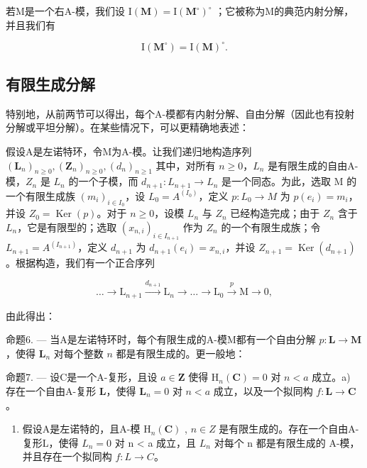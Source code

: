 若M是一个右A-模，我们设 \(\mathrm{I}(\mathbf{M}) = \mathrm{I}(\mathbf{M}^{\circ})^{\circ}\) ；它被称为M的典范内射分解，并且我们有

\[
\mathrm{I} (\mathbf {M} ^ {\circ}) = \mathrm{I} (\mathbf {M}) ^ {\circ}.
\]

\subsection{有限生成分解}

特别地，从前两节可以得出，每个A-模都有内射分解、自由分解（因此也有投射分解或平坦分解）。在某些情况下，可以更精确地表述：

假设A是左诺特环，令M为A-模。让我们递归地构造序列 \((\mathbf{L}_{n})_{n\geqslant0},(\mathbf{Z}_{n})_{n\geqslant0},(d_{n})_{n\geqslant1}\) 其中，对所有 \(n\geqslant0\)，\(L_{n}\) 是有限生成的自由A-模，\(Z_{n}\) 是 \(L_{n}\) 的一个子模，而 \(d_{n+1}:L_{n+1}\to L_{n}\) 是一个同态。为此，选取 M 的一个有限生成族 \((m_{i})_{i\in I_{0}}\)，设 \(L_{0}=A^{(I_{0})}\)，定义 \(p:L_{0}\to M\) 为 \(p(e_{i})=m_{i}\)，并设 \(Z_{0}=\operatorname{Ker}(p)\)。对于 \(n\geqslant0\)，设模 \(L_{n}\) 与 \(Z_{n}\) 已经构造完成；由于 \(Z_{n}\) 含于 \(L_{n}\)，它是有限型的；选取 \((x_{n,i})_{i\in I_{n+1}}\) 作为 \(Z_{n}\) 的一个有限生成族；令 \(L_{n+1}=A^{(I_{n+1})}\)，定义 \(d_{n+1}\) 为 \(d_{n+1}(e_{i})=x_{n,i}\)，并设 \(Z_{n+1}=\operatorname{Ker}(d_{n+1})\)。根据构造，我们有一个正合序列

\[
\dots \longrightarrow \mathrm{L} _ {n + 1} \xrightarrow {d _ {n + 1}} \mathrm{L} _ {n} \longrightarrow \dots \longrightarrow \mathrm{L} _ {0} \xrightarrow {p} \mathrm{M} \longrightarrow 0,
\]

由此得出：

命题6. --- 当A是左诺特环时，每个有限生成的A-模M都有一个自由分解 \(p: \mathbf{L} \to \mathbf{M}\)，使得 \(\mathbf{L}_n\) 对每个整数 \(n\) 都是有限生成的。更一般地：

命题7. --- 设C是一个A-复形，且设 \(a \in \mathbf{Z}\) 使得 \(\mathrm{H}_{n}(\mathbf{C}) = 0\) 对 \(n < a\) 成立。a) 存在一个自由A-复形 \(\mathbf{L}\)，使得 \(\mathbf{L}_{n} = 0\) 对 \(n < a\) 成立，以及一个拟同构 \(f: \mathbf{L} \to \mathbf{C}\)。

\begin{enumerate}
\def\labelenumi{\alph{enumi})}
\setcounter{enumi}{1}
\tightlist
\item
  假设A是左诺特的，且A-模 \(\mathrm{H}_{n}(\mathbf{C})\) , \(n \in Z\) 是有限生成的。存在一个自由A-复形L，使得 \(L_{n} = 0\) 对 n \textless{} a 成立，且 \(L_{n}\) 对每个 n 都是有限生成的 A-模，并且存在一个拟同构 \(f: L \to C\)。
\end{enumerate}

